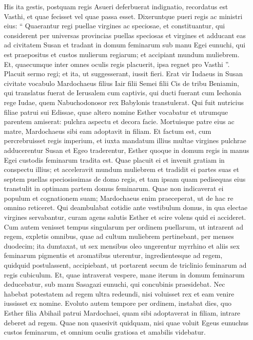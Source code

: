 \begin{biblechapter}
\begin{biblechapter}
\verse His ita gestis, postquam regis Asueri deferbuerat indignatio, recordatus est Vasthi, et quae fecisset vel quae passa esset. 
\verse Dixeruntque pueri regis ac ministri eius: “ Quaerantur regi puellae virgines ac speciosae, 
\verse et constituantur, qui considerent per universas provincias puellas speciosas et virgines et adducant eas ad civitatem Susan et tradant in domum feminarum sub manu Egei eunuchi, qui est praepositus et custos mulierum regiarum; et accipiant mundum muliebrem. 
\verse Et, quaecumque inter omnes oculis regis placuerit, ipsa regnet pro Vasthi ”. Placuit sermo regi; et ita, ut suggesserant, iussit fieri.
 \verse Erat vir Iudaeus in Susan civitate vocabulo Mardochaeus filius Iair filii Semei filii Cis de tribu Beniamin, 
\verse qui translatus fuerat de Ierusalem cum captivis, qui ducti fuerant cum Iechonia rege Iudae, quem Nabuchodonosor rex Babylonis transtulerat. 
\verse Qui fuit nutricius filiae patrui sui Edissae, quae altero nomine Esther vocabatur et utrumque parentem amiserat: pulchra aspectu et decora facie. Mortuisque patre eius ac matre, Mardochaeus sibi eam adoptavit in filiam.
 \verse Et factum est, cum percrebruisset regis imperium, et iuxta mandatum illius multae virgines pulchrae adducerentur Susan et Egeo traderentur, Esther quoque in domum regis in manus Egei custodis feminarum tradita est. 
\verse Quae placuit ei et invenit gratiam in conspectu illius; et acceleravit mundum muliebrem et tradidit ei partes suas et septem puellas speciosissimas de domo regis, et tam ipsam quam pedisequas eius transtulit in optimam partem domus feminarum. 
\verse Quae non indicaverat ei populum et cognationem suam; Mardochaeus enim praeceperat, ut de hac re omnino reticeret. 
\verse Qui deambulabat cotidie ante vestibulum domus, in qua electae virgines servabantur, curam agens salutis Esther et scire volens quid ei accideret.
 \verse Cum autem venisset tempus singularum per ordinem puellarum, ut intrarent ad regem, expletis omnibus, quae ad cultum muliebrem pertinebant, per menses duodecim; ita dumtaxat, ut sex mensibus oleo ungerentur myrrhino et aliis sex feminarum pigmentis et aromatibus uterentur, 
\verse ingredientesque ad regem, quidquid postulassent, accipiebant, ut portarent secum de triclinio feminarum ad regis cubiculum. 
\verse Et, quae intraverat vespere, mane iterum in domum feminarum deducebatur, sub manu Sasagazi eunuchi, qui concubinis praesidebat. Nec habebat potestatem ad regem ultra redeundi, nisi voluisset rex et eam venire iussisset ex nomine.
 \verse Evoluto autem tempore per ordinem, instabat dies, quo Esther filia Abihail patrui Mardochaei, quam sibi adoptaverat in filiam, intrare deberet ad regem. Quae non quaesivit quidquam, nisi quae voluit Egeus eunuchus custos feminarum, et omnium oculis gratiosa et amabilis videbatur. 

\end{biblechapter}
\end{biblechapter}
